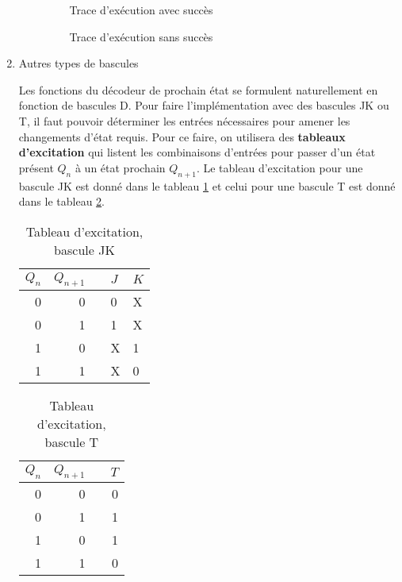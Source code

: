 \documentclass[letter, oneside]{book}
\begin{document}
\begin{enumerate}
\begin{enumerate}
\begin{figure}[htbp]
\centering

\caption{\label{fig:org25dbb1e}Trace d'exécution avec succès}
\end{figure}

\begin{figure}[htbp]
\centering

\caption{\label{fig:org20bf403}Trace d'exécution sans succès}
\end{figure}
\end{enumerate}

\item Autres types de bascules
\label{sec:org9073b68}

Les fonctions du décodeur de prochain état se formulent naturellement
en fonction de bascules D.  Pour faire l'implémentation avec des
bascules JK ou T, il faut pouvoir déterminer les entrées nécessaires
pour amener les changements d'état requis. Pour ce faire, on
utilisera des \textbf{tableaux d'excitation} qui listent les combinaisons
d'entrées pour passer d'un état présent \(Q_n\) à un état prochain
\(Q_{n+1}\). Le tableau d'excitation pour une bascule JK est donné
dans le tableau \ref{tab:org32133ba} et celui pour une bascule T est donné
dans le tableau \ref{tab:org805be92}.

\begin{table}[htbp]
\caption{\label{tab:org32133ba}Tableau d'excitation, bascule JK}
\centering
\begin{tabular}{rrlll}
\(Q_n\) & \(Q_{n+1}\) &  & \(J\) & \(K\)\\[0pt]
\hline
0 & 0 &  & 0 & X\\[0pt]
0 & 1 &  & 1 & X\\[0pt]
1 & 0 &  & X & 1\\[0pt]
1 & 1 &  & X & 0\\[0pt]
\end{tabular}
\end{table}

\begin{table}[htbp]
\caption{\label{tab:org805be92}Tableau d'excitation, bascule T}
\centering
\begin{tabular}{rrlr}
\(Q_n\) & \(Q_{n+1}\) &  & \(T\)\\[0pt]
\hline
0 & 0 &  & 0\\[0pt]
0 & 1 &  & 1\\[0pt]
1 & 0 &  & 1\\[0pt]
1 & 1 &  & 0\\[0pt]
\end{tabular}
\end{table}


\end{enumerate}
\end{document}
